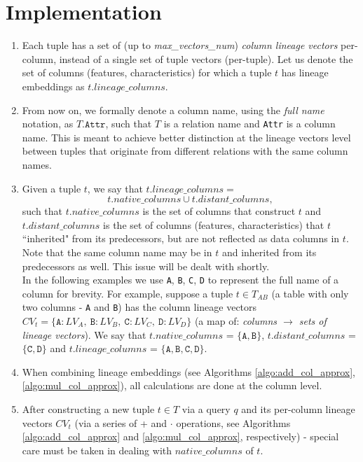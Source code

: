 \section{Implementation} 
\begin{enumerate}
    \item Each tuple has a set of (up to \textit{max\_vectors\_num}) \textit{column lineage vectors} per-column, instead of a single set of tuple vectors (per-tuple). Let us denote the set of columns (features, characteristics) for which a tuple $t$ has lineage embeddings as $t.lineage\_columns$.
    \item From now on, we formally denote a column name, using the \textit{full name} notation, as $T.\texttt{Attr}$, such that $T$ is a relation name and \texttt{Attr} is a column name. This is meant to achieve better distinction at the lineage vectors level between tuples that originate from different relations with the same column names. 
    \item Given a tuple $t$, we say that $t.lineage\_columns = $
        \begin{equation*}
            t.native\_columns \cup t.distant\_columns,
        \end{equation*}
    such that $t.native\_columns$ is the set of columns that construct $t$ and $t.distant\_columns$ is the set of columns (features, characteristics) that $t$ ``inherited" from its predecessors, but are not reflected as data columns in $t$.
    Note that the same column name may be in $t$ and inherited from its predecessors as well. This issue will be dealt with shortly.\\
    In the following examples we use \texttt{A}, \texttt{B}, \texttt{C}, \texttt{D} to represent the full name of a column for brevity. For example, suppose a tuple $t \in T_{AB}$ (a table with only two columns - \texttt{A} and \texttt{B}) has the column lineage vectors $CV_t = \{\texttt{A}\!: LV_A,\: \texttt{B}\!: LV_B,\: \texttt{C}\!: LV_C,\: \texttt{D}\!: LV_D\}$ (a map of: \textit{columns $\rightarrow$ sets of lineage vectors}). We say that $t.native\_columns$ = $\{\texttt{A}, \texttt{B}\}$, $t.distant\_columns$ = $\{\texttt{C}, \texttt{D}\}$ and $t.lineage\_columns$ = $\{\texttt{A}, \texttt{B}, \texttt{C}, \texttt{D}\}$.
    \item When combining lineage embeddings (see Algorithms \ref{algo:add_col_approx},\ref{algo:mul_col_approx}), all calculations are done at the column level.
    \item After constructing a new tuple $t \in T$ via a query $q$ and its per-column lineage vectors $CV_t$ (via a series of + and $\cdot$ operations, see Algorithms \ref{algo:add_col_approx} and \ref{algo:mul_col_approx}, respectively) - special care must be taken in dealing with $native\_columns$ of $t$.

\end{enumerate}
